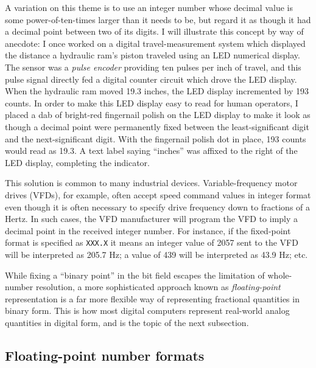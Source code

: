 \vskip 10pt

A variation on this theme is to use an integer number whose decimal value is some power-of-ten-times larger than it needs to be, but regard it as though it had a decimal point between two of its digits.  I will illustrate this concept by way of anecdote: I once worked on a digital travel-measurement system which displayed the distance a hydraulic ram's piston traveled using an LED numerical display.  The sensor was a {\it pulse encoder} providing ten pulses per inch of travel, and this pulse signal directly fed a digital counter circuit which drove the LED display.  When the hydraulic ram moved 19.3 inches, the LED display incremented by 193 counts.  In order to make this LED display easy to read for human operators, I placed a dab of bright-red fingernail polish on the LED display to make it look as though a decimal point were permanently fixed between the least-significant digit and the next-significant digit.  With the fingernail polish dot in place, 193 counts would read as 19.3.  A text label saying ``inches'' was affixed to the right of the LED display, completing the indicator.

This solution is common to many industrial devices.  Variable-frequency motor drives (VFDs), for example, often accept speed command values in integer format even though it is often necessary to specify drive frequency down to fractions of a Hertz.  In such cases, the VFD manufacturer will program the VFD to imply a decimal point in the received integer number.  For instance, if the fixed-point format is specified as \texttt{XXX.X} it means an integer value of 2057 sent to the VFD will be interpreted as 205.7 Hz; a value of 439 will be interpreted as 43.9 Hz; etc.    

\vskip 10pt

While fixing a ``binary point'' in the bit field escapes the limitation of whole-number resolution, a more sophisticated approach known as \textit{floating-point} representation is a far more flexible way of representing fractional quantities in binary form.  This is how most digital computers represent real-world analog quantities in digital form, and is the topic of the next subsection.







\filbreak
\subsection{Floating-point number formats}

